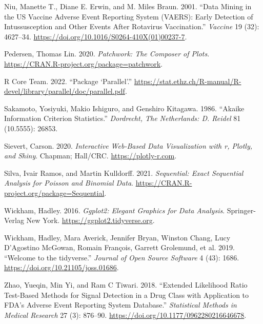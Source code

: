 \begin{CSLReferences}{1}{0}
\leavevmode{}%
Niu, Manette T., Diane E. Erwin, and M. Miles Braun. 2001. {``{Data Mining in the US Vaccine Adverse Event Reporting System (VAERS): Early Detection of Intussusception and Other Events After Rotavirus Vaccination}.''} \emph{Vaccine} 19 (32): 4627--34. \url{https://doi.org/10.1016/S0264-410X(01)00237-7}.

\leavevmode{}%
Pedersen, Thomas Lin. 2020. \emph{Patchwork: The Composer of Plots}. \url{https://CRAN.R-project.org/package=patchwork}.

\leavevmode{}%
R Core Team. 2022. {``Package {`Parallel'}.''} \url{https://stat.ethz.ch/R-manual/R-devel/library/parallel/doc/parallel.pdf}.

\leavevmode{}%
Sakamoto, Yosiyuki, Makio Ishiguro, and Genshiro Kitagawa. 1986. {``Akaike Information Criterion Statistics.''} \emph{Dordrecht, The Netherlands: D. Reidel} 81 (10.5555): 26853.

\leavevmode{}%
Sievert, Carson. 2020. \emph{Interactive Web-Based Data Visualization with r, Plotly, and Shiny}. Chapman; Hall/CRC. \url{https://plotly-r.com}.

\leavevmode{}%
Silva, Ivair Ramos, and Martin Kulldorff. 2021. \emph{{Sequential: Exact Sequential Analysis for Poisson and Binomial Data}}. \url{https://CRAN.R-project.org/package=Sequential}.

\leavevmode{}%
Wickham, Hadley. 2016. \emph{Ggplot2: Elegant Graphics for Data Analysis}. Springer-Verlag New York. \url{https://ggplot2.tidyverse.org}.

\leavevmode{}%
Wickham, Hadley, Mara Averick, Jennifer Bryan, Winston Chang, Lucy D'Agostino McGowan, Romain François, Garrett Grolemund, et al. 2019. {``Welcome to the {tidyverse}.''} \emph{Journal of Open Source Software} 4 (43): 1686. \url{https://doi.org/10.21105/joss.01686}.

\leavevmode{}%
Zhao, Yueqin, Min Yi, and Ram C Tiwari. 2018. {``Extended Likelihood Ratio Test-Based Methods for Signal Detection in a Drug Class with Application to FDA{'}s Adverse Event Reporting System Database.''} \emph{Statistical Methods in Medical Research} 27 (3): 876--90. \url{https://doi.org/10.1177/0962280216646678}.

\end{CSLReferences}

